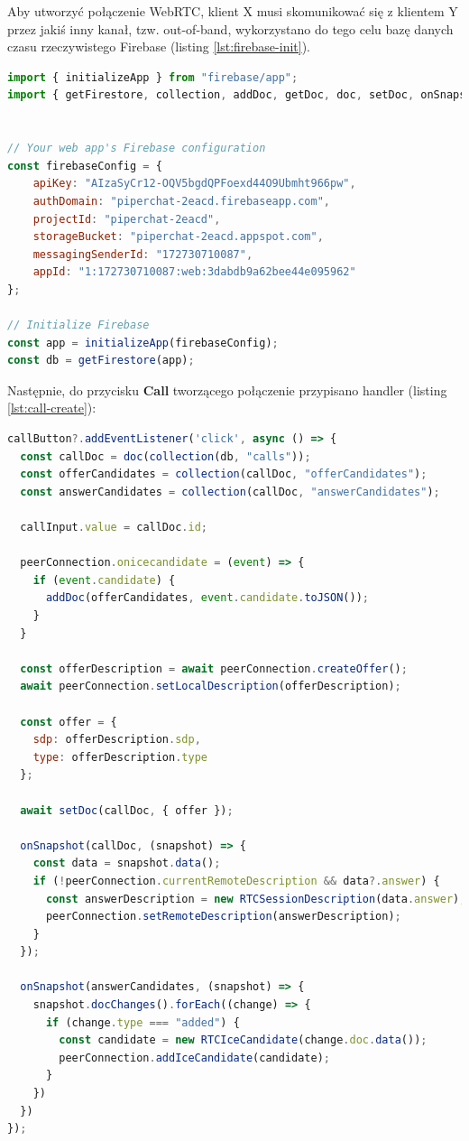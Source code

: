 Aby utworzyć połączenie WebRTC, klient X musi skomunikować się z klientem Y przez jakiś inny
kanał, tzw. out-of-band, wykorzystano do tego celu bazę danych czasu rzeczywistego Firebase (listing
\ref{lst:firebase-init}).

\begin{lstlisting}[language=Javascript,label=lst:firebase-init, caption=Inicjalizacja Firebase,
basicstyle=\footnotesize \ttfamily, showtabs=true, tabsize=4]
import { initializeApp } from "firebase/app";
import { getFirestore, collection, addDoc, getDoc, doc, setDoc, onSnapshot, updateDoc } from "firebase/firestore";


// Your web app's Firebase configuration
const firebaseConfig = {
    apiKey: "AIzaSyCr12-OQV5bgdQPFoexd44O9Ubmht966pw",
    authDomain: "piperchat-2eacd.firebaseapp.com",
    projectId: "piperchat-2eacd",
    storageBucket: "piperchat-2eacd.appspot.com",
    messagingSenderId: "172730710087",
    appId: "1:172730710087:web:3dabdb9a62bee44e095962"
};

// Initialize Firebase
const app = initializeApp(firebaseConfig);
const db = getFirestore(app);
\end{lstlisting}

Następnie, do przycisku \textbf{Call} tworzącego połączenie przypisano handler (listing \ref{lst:call-create}):

\begin{lstlisting}[language=Javascript,label=lst:call-create, caption=Tworzenie połączenia,
basicstyle=\footnotesize \ttfamily, showtabs=true, tabsize=4]
callButton?.addEventListener('click', async () => {
  const callDoc = doc(collection(db, "calls"));
  const offerCandidates = collection(callDoc, "offerCandidates");
  const answerCandidates = collection(callDoc, "answerCandidates");

  callInput.value = callDoc.id;

  peerConnection.onicecandidate = (event) => {
    if (event.candidate) {
      addDoc(offerCandidates, event.candidate.toJSON());
    }
  }

  const offerDescription = await peerConnection.createOffer();
  await peerConnection.setLocalDescription(offerDescription);

  const offer = {
    sdp: offerDescription.sdp,
    type: offerDescription.type
  };

  await setDoc(callDoc, { offer });

  onSnapshot(callDoc, (snapshot) => {
    const data = snapshot.data();
    if (!peerConnection.currentRemoteDescription && data?.answer) {
      const answerDescription = new RTCSessionDescription(data.answer);
      peerConnection.setRemoteDescription(answerDescription);
    }
  });

  onSnapshot(answerCandidates, (snapshot) => {
    snapshot.docChanges().forEach((change) => {
      if (change.type === "added") {
        const candidate = new RTCIceCandidate(change.doc.data());
        peerConnection.addIceCandidate(candidate);
      }
    })
  })
});
\end{lstlisting}

